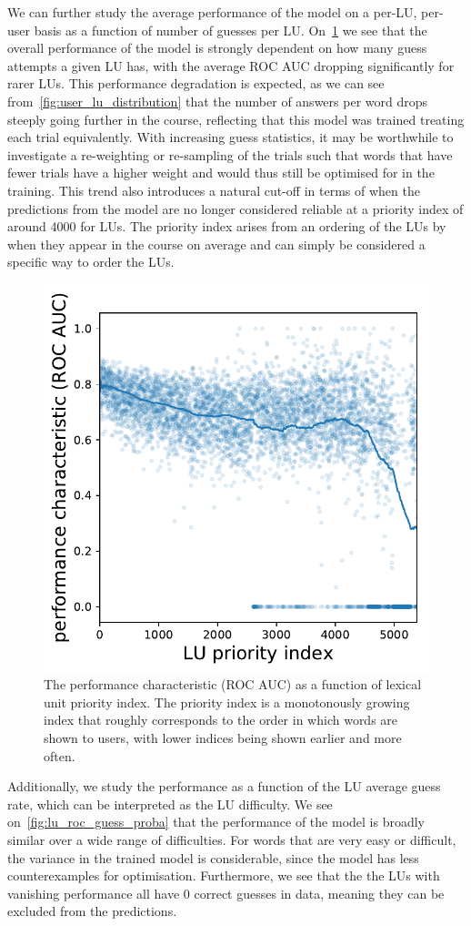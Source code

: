 We can further study the average performance of the model on a per-LU, per-user basis as a function of number of guesses per LU. On~\cref{fig:lu_roc_prio} we see that the overall performance of the model is strongly dependent on how many guess attempts a given LU has, with the average ROC AUC dropping significantly for rarer LUs. This performance degradation is expected, as we can see from~\cref{fig:user_lu_distribution} that the number of answers per word drops steeply going further in the course, reflecting that this model was trained treating each trial equivalently. With increasing guess statistics, it may be worthwhile to investigate a re-weighting or re-sampling of the trials such that words that have fewer trials have a higher weight and would thus still be optimised for in the training. This trend also introduces a natural cut-off in terms of when the predictions from the model are no longer considered reliable at a priority index of around 4000 for LUs. The priority index arises from an ordering of the LUs by when they appear in the course on average and can simply be considered a specific way to order the LUs.

\begin{figure}[ht]
\centering
\includegraphics[width=0.5\linewidth]{figures/lingvist/lu_roc_prio.pdf}
\caption[Performance of knowledge estimation as a function of LU priority.]{The performance characteristic (ROC AUC) as a function of lexical unit priority index. The priority index is a monotonously growing index that roughly corresponds to the order in which words are shown to users, with lower indices being shown earlier and more often.}
\label{fig:lu_roc_prio}
\end{figure}

Additionally, we study the performance as a function of the LU average guess rate, which can be interpreted as the LU difficulty. We see on~\cref{fig:lu_roc_guess_proba} that the performance of the model is broadly similar over a wide range of difficulties. For words that are very easy or difficult, the variance in the trained model is considerable, since the model has less counterexamples for optimisation. Furthermore, we see that the the LUs with vanishing performance all have 0 correct guesses in data, meaning they can be excluded from the predictions.

